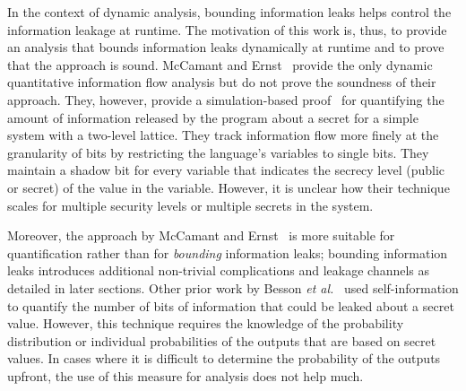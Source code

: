 
In the context of dynamic analysis, bounding information leaks helps
control the information leakage at runtime. The motivation of this
work is, thus, to provide an analysis that bounds information leaks
dynamically at runtime and to prove that the approach is sound. 
McCamant and Ernst~ provide the only dynamic 
quantitative information flow analysis but do not prove the
soundness of their approach. They, however, provide a simulation-based 
proof~ for quantifying the amount of information
released by the program about a secret for a simple system with a
two-level lattice. They track information flow more finely at the
granularity of bits by restricting the language's variables to single
bits. They maintain a shadow bit for every variable that
indicates the secrecy level (public or secret) of the value in the
variable. However, it is unclear how their technique scales for
multiple security levels or multiple secrets in the system. 

Moreover, the approach by McCamant and Ernst~ 
is more suitable for quantification rather than for \emph{bounding} 
information leaks; bounding information leaks introduces additional 
non-trivial complications and leakage channels as detailed in later
sections. Other prior work by Besson \emph{et al.}~ 
used self-information to
quantify the number of bits of information that could be leaked about
a secret value. However, this technique requires the knowledge of the
probability distribution or individual probabilities of the outputs
that are based on secret values. In cases where it is difficult to
determine the probability of the outputs upfront, the use of this
measure for analysis does not help much.   

